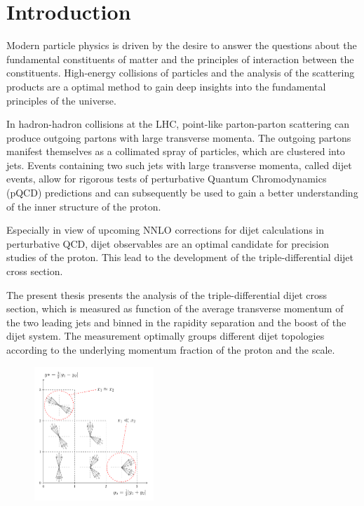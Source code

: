 
\chapter{Introduction}

Modern particle physics is driven by the desire to answer the questions about the
fundamental constituents of matter and the principles of interaction between the
constituents. High-energy collisions of particles and the analysis of the
scattering products are a optimal method to gain deep insights into the
fundamental principles of the universe. 

In hadron-hadron collisions at the LHC, point-like parton-parton scattering can
produce outgoing partons with large transverse momenta. The outgoing partons
manifest themselves as a collimated spray of particles, which are clustered into
jets. Events containing two such jets with large transverse momenta, called
dijet events, allow for rigorous tests of perturbative Quantum Chromodynamics
(pQCD) predictions and can subsequently be used to gain a better understanding
of the inner structure of the proton. 

Especially in view of upcoming NNLO corrections for dijet calculations in
perturbative QCD, dijet observables are an optimal candidate for precision
studies of the proton. This lead to the development of the triple-differential
dijet cross section. 

The present thesis presents the analysis of the triple-differential dijet cross
section, which is measured as function of the average transverse momentum of the
two leading jets and binned in the rapidity separation and the boost of the
dijet system. The measurement optimally groups different dijet topologies
according to the underlying momentum fraction of the proton and the scale.


\begin{figure}[h!tb]
    \centering
    \includegraphics[width=0.4\textwidth]{figures/drawings/ybys_hint.pdf}
\end{figure}

